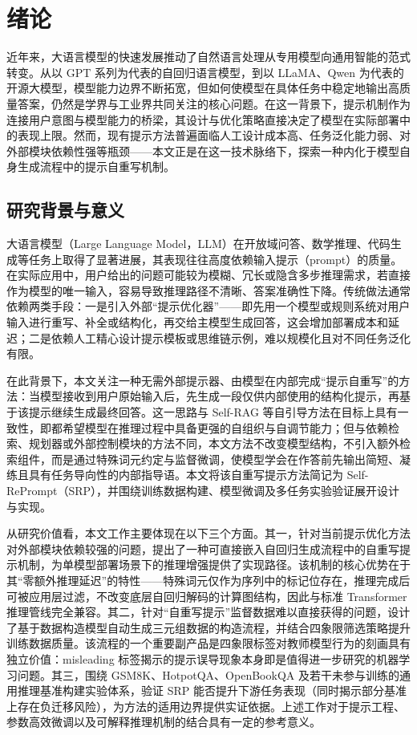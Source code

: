 
\chapter{绪论}

近年来，大语言模型的快速发展推动了自然语言处理从专用模型向通用智能的范式转变。从以 GPT 系列为代表的自回归语言模型，到以 LLaMA、Qwen 为代表的开源大模型，模型能力边界不断拓宽，但如何使模型在具体任务中稳定地输出高质量答案，仍然是学界与工业界共同关注的核心问题。在这一背景下，提示机制作为连接用户意图与模型能力的桥梁，其设计与优化策略直接决定了模型在实际部署中的表现上限。然而，现有提示方法普遍面临人工设计成本高、任务泛化能力弱、对外部模块依赖性强等瓶颈——本文正是在这一技术脉络下，探索一种内化于模型自身生成流程中的提示自重写机制。

\section{研究背景与意义}

大语言模型（Large Language Model，LLM）在开放域问答、数学推理、代码生成等任务上取得了显著进展，其表现往往高度依赖输入提示（prompt）的质量。在实际应用中，用户给出的问题可能较为模糊、冗长或隐含多步推理需求，若直接作为模型的唯一输入，容易导致推理路径不清晰、答案准确性下降。传统做法通常依赖两类手段：一是引入外部“提示优化器”——即先用一个模型或规则系统对用户输入进行重写、补全或结构化，再交给主模型生成回答，这会增加部署成本和延迟；二是依赖人工精心设计提示模板或思维链示例，难以规模化且对不同任务泛化有限。

在此背景下，本文关注一种无需外部提示器、由模型在内部完成“提示自重写”的方法：当模型接收到用户原始输入后，先生成一段仅供内部使用的结构化提示，再基于该提示继续生成最终回答。这一思路与 Self-RAG 等自引导方法在目标上具有一致性，即都希望模型在推理过程中具备更强的自组织与自调节能力；但与依赖检索、规划器或外部控制模块的方法不同，本文方法不改变模型结构，不引入额外检索组件，而是通过特殊词元约定与监督微调，使模型学会在作答前先输出简短、凝练且具有任务导向性的内部指导语。本文将该自重写提示方法简记为 Self-RePrompt（SRP），并围绕训练数据构建、模型微调及多任务实验验证展开设计与实现。

从研究价值看，本文工作主要体现在以下三个方面。其一，针对当前提示优化方法对外部模块依赖较强的问题，提出了一种可直接嵌入自回归生成流程中的自重写提示机制，为单模型部署场景下的推理增强提供了实现路径。该机制的核心优势在于其“零额外推理延迟”的特性——特殊词元仅作为序列中的标记位存在，推理完成后可被应用层过滤，不改变底层自回归解码的计算图结构，因此与标准 Transformer 推理管线完全兼容。其二，针对“自重写提示”监督数据难以直接获得的问题，设计了基于数据构造模型自动生成三元组数据的构造流程，并结合四象限筛选策略提升训练数据质量。该流程的一个重要副产品是四象限标签对教师模型行为的刻画具有独立价值：misleading 标签揭示的提示误导现象本身即是值得进一步研究的机器学习问题。其三，围绕 GSM8K、HotpotQA、OpenBookQA 及若干未参与训练的通用推理基准构建实验体系，验证 SRP 能否提升下游任务表现（同时揭示部分基准上存在负迁移风险），为方法的适用边界提供实证依据。上述工作对于提示工程、参数高效微调以及可解释推理机制的结合具有一定的参考意义。

